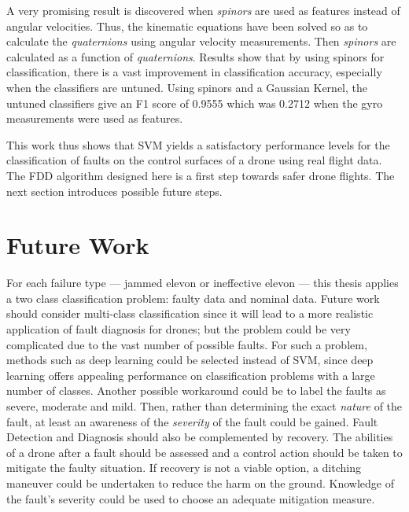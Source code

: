 A very promising result is discovered when \emph{spinors} are used as features instead of angular velocities. Thus, the kinematic equations have been solved so as to calculate the \emph{quaternions} using angular velocity measurements. Then \emph{spinors} are calculated as a function of \emph{quaternions}. Results show that by using spinors for classification, there is a vast improvement in classification accuracy, especially when the classifiers are untuned. Using spinors and a Gaussian Kernel, the untuned classifiers give an F1 score of 0.9555 which was 0.2712 when the gyro measurements were used as features. 

This work thus shows that SVM yields a satisfactory performance levels for the classification of faults on the control surfaces of a drone using real flight data. The FDD algorithm designed here is a first step towards safer drone flights. The next section introduces possible future steps. 

\section{Future Work}

For each failure type --- jammed elevon or ineffective elevon --- this thesis applies a two class classification problem: faulty data and nominal data. 
Future work should consider multi-class classification since it will lead to a more realistic application of fault diagnosis for drones; but the problem could be very complicated due to the vast number of possible faults. 
For such a problem, methods such as deep learning could be selected instead of SVM, since deep learning offers appealing performance on classification problems with a large number of classes. 
Another possible workaround could be to label the faults as severe, moderate and mild. Then, rather than determining the exact  \emph{nature} of the fault, at least an awareness of the  \emph{severity} of the fault could be gained.
Fault Detection and Diagnosis should also be complemented by recovery. The abilities of a drone after a fault should be assessed and a control action should be taken to mitigate the faulty situation. If recovery is not a viable option, a ditching maneuver could be undertaken to reduce the harm on the ground. Knowledge of the fault's severity could be used to choose an adequate mitigation measure.
